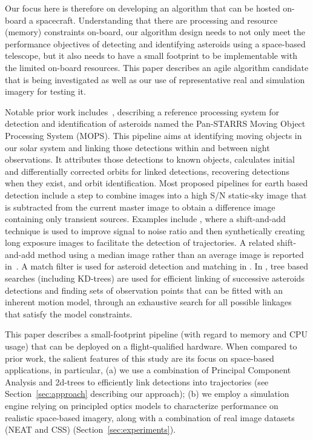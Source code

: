 \documentclass{article}
\begin{document}
Our focus here is therefore on developing an algorithm that can be hosted on-board a spacecraft.  Understanding that there are processing and resource (memory) constraints on-board, our algorithm design needs to not only meet the performance objectives of detecting and identifying asteroids using a space-based telescope, but it also needs to have a small footprint to be implementable with the limited on-board resources.  This paper describes an agile algorithm candidate that is being investigated as well as our use of representative real and simulation imagery for testing it.

Notable prior work includes~\cite{denneau2013pan}, describing a reference processing system for detection and identification of asteroids named the Pan-STARRS Moving Object Processing System (MOPS). This pipeline aims at identifying moving objects in our solar system and linking those detections within and between night observations. It attributes those detections to known objects, calculates initial and differentially corrected orbits for linked detections, recovering detections when they exist, and orbit identification. Most proposed pipelines for earth based detection include a step to combine images into	 a high S/N static-sky image that is subtracted from the current master image to obtain a difference image containing only transient sources. Examples include \cite{shao2014finding}, where a shift-and-add technique is used to improve  signal to noise ratio and then synthetically creating long exposure images to facilitate the detection of trajectories. A related shift-and-add method using a median  image rather than an average image is reported in~\cite{yanagisawa2005automatic}. A match filter is used for asteroid detection and matching in \cite{gural2005matched}. In \cite{kubica2005variable,kubica2005multiple,kubica2007efficient}, tree based searches (including KD-trees) are used for efficient linking of successive asteroids detections and finding sets of observation points that can be fitted with an inherent motion model, through an exhaustive search for all possible linkages that satisfy the model constraints.
	
	This paper describes a small-footprint pipeline (with regard to memory and CPU usage) that can be deployed on a flight-qualified hardware. When compared to prior work, the salient features of this study are its focus on space-based applications, in particular, (a) we use a combination of Principal Component Analysis and 2d-trees to efficiently link detections into trajectories (see Section~\ref{sec:approach} describing our approach); (b) we employ a simulation engine relying on principled optics  models to characterize  performance on realistic space-based imagery, along with a combination of real image datasets (NEAT and CSS) (Section~\ref{sec:experiments}).
		
\end{document}
